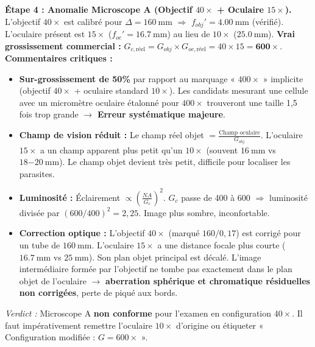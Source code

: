 \documentclass[11pt]{article}
\begin{document}
\begin{exoresolu}
\medskip
\noindent \textbf{Étape 4 : Anomalie Microscope A (Objectif $40\times$ + Oculaire $15\times$).}
\medskip
\noindent L'objectif $40\times$ est calibré pour $\Delta = \SI{160}{\mm}$ $\Rightarrow$ $f_{obj}' = \SI{4,00}{\mm}$ (vérifié).
L'oculaire présent est $15\times$ ($f_{oc}' = \SI{16,7}{\mm}$) au lieu de $10\times$ ($\SI{25,0}{\mm}$).
\medskip
\noindent \textbf{Vrai grossissement commercial :} $G_{c,\text{réel}} = G_{obj} \times G_{oc,\text{réel}} = 40 \times 15 = \mathbf{600\times}$.
\medskip
\noindent \textbf{Commentaires critiques :}
\begin{itemize}
    \item \textbf{Sur-grossissement de 50\%} par rapport au marquage « $400\times$ » implicite (objectif $40\times$ + oculaire standard $10\times$). Les candidats mesurant une cellule avec un micromètre oculaire étalonné pour $400\times$ trouveront une taille 1,5 fois trop grande $\rightarrow$ \textbf{Erreur systématique majeure}.
    \item \textbf{Champ de vision réduit :} Le champ réel objet $= \frac{\text{Champ oculaire}}{G_{obj}}$. L'oculaire $15\times$ a un champ apparent plus petit qu'un $10\times$ (souvent $\SI{16}{\mm}$ vs $\SI{18-20}{\mm}$). Le champ objet devient très petit, difficile pour localiser les parasites.
    \item \textbf{Luminosité :} Éclairement $\propto \left(\frac{NA}{G_c}\right)^2$. $G_c$ passe de 400 à 600 $\Rightarrow$ luminosité divisée par $(600/400)^2 = 2,25$. Image plus sombre, inconfortable.
    \item \textbf{Correction optique :} L'objectif $40\times$ (marqué $160/0,17$) est corrigé pour un tube de $\SI{160}{\mm}$. L'oculaire $15\times$ a une distance focale plus courte ($\SI{16,7}{\mm}$ vs $\SI{25}{\mm}$). Son plan objet principal est décalé. L'image intermédiaire formée par l'objectif ne tombe pas exactement dans le plan objet de l'oculaire $\rightarrow$ \textbf{aberration sphérique et chromatique résiduelles non corrigées}, perte de piqué aux bords.
\end{itemize}
\emph{Verdict :} Microscope A \textbf{non conforme} pour l'examen en configuration $40\times$. Il faut impérativement remettre l'oculaire $10\times$ d'origine ou étiqueter « Configuration modifiée : $G=600\times$ ».


\end{exoresolu}
\end{document}
